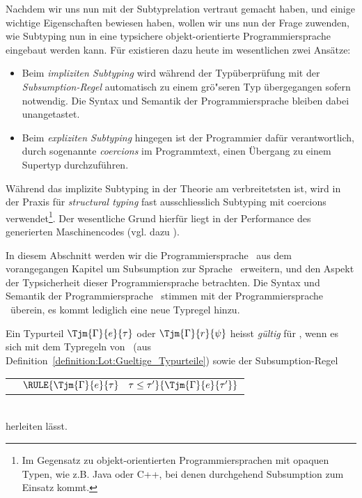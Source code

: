 Nachdem wir uns nun mit der Subtyprelation vertraut gemacht haben, und einige wichtige Eigenschaften
bewiesen haben, wollen wir uns nun der Frage zuwenden, wie Subtyping nun in eine
typsichere objekt-orientierte Programmiersprache eingebaut werden kann. F\"ur  existieren dazu heute im wesentlichen zwei Ans\"atze:
\begin{itemize}
  \item Beim {\em impliziten Subtyping} wird w\"ahrend der Typ\"uberpr\"ufung mit der
        {\em Subsumption-Regel} automatisch zu einem gr\"o"seren Typ
        \"ubergegangen sofern notwendig. Die Syntax und Semantik der Programmiersprache bleiben dabei
        unangetastet.

  \item Beim {\em expliziten Subtyping} hingegen ist der Programmier daf\"ur
        verantwortlich, durch sogenannte {\em coercions} im Programmtext, einen
        \"Ubergang zu einem Supertyp durchzuf\"uhren.
\end{itemize}
W\"ahrend das implizite Subtyping in der Theorie am verbreitetsten ist, wird in der Praxis f\"ur
{\em structural typing} fast ausschliesslich Subtyping mit coercions verwendet\footnote{Im Gegensatz
zu objekt-orientierten Programmiersprachen mit opaquen Typen, wie z.B. Java oder C++, bei denen
durchgehend Subsumption zum Einsatz kommt.}. Der wesentliche Grund hierf\"ur liegt in der Performance
des generierten Maschinencodes (vgl. dazu \cite[S.200ff]{Pierce02}).

In diesem Abschnitt werden wir die Programmiersprache \Lot\ aus dem vorangegangen Kapitel um 
Subsumption zur Sprache \Losub\ erweitern, und den Aspekt der Typsicherheit
dieser Programmiersprache betrachten. Die Syntax und Semantik der Programmiersprache \Losub\ stimmen
mit der Programmiersprache \Lot\ \"uberein, es kommt lediglich eine neue Typregel hinzu.

\begin{definition} \label{definition:Losub:Gueltige_Typurteile}
  Ein Typurteil $\Tjm{\Gamma}{e}{\tau}$ oder $\Tjm{\Gamma}{r}{\psi}$ heisst {\em g\"ultig} f\"ur
  \Losub, wenn es sich mit dem Typregeln von \Lot\ (aus
  Definition~\ref{definition:Lot:Gueltige_Typurteile}) sowie der Subsumption-Regel \\[5mm]
  \begin{tabular}{ll}
    \RN{Subsume} & $ \RULE{\Tjm{\Gamma}{e}{\tau} \quad \tau \le \tau'}
                          {\Tjm{\Gamma}{e}{\tau'}}$
  \end{tabular} \\[7mm]
  herleiten l\"asst.
\end{definition}

